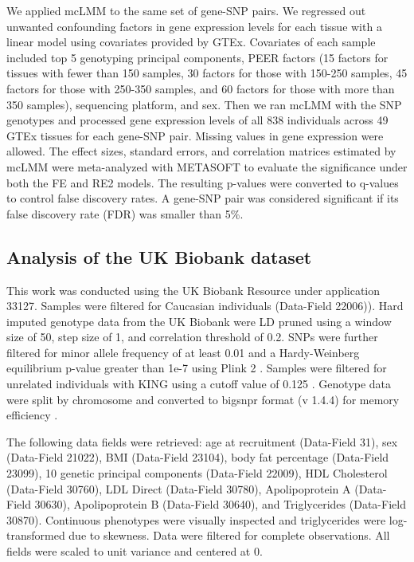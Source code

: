         We applied mcLMM to the same set of gene-SNP pairs. We regressed out unwanted confounding factors in gene expression levels for each tissue with a linear model using covariates provided by GTEx. Covariates of each sample included 
        top 5 genotyping principal components, PEER factors \cite{Stegle2012-zc} (15 factors for tissues with fewer than 150 samples, 30 factors for those with 150-250 samples, 45 factors for those with 250-350 samples, and 60 factors for those with more than 350 samples), sequencing platform, and sex. Then we ran mcLMM with the SNP genotypes and processed gene expression levels of all 838 individuals across 49 GTEx tissues for each gene-SNP pair. Missing values in gene expression were allowed. The effect sizes, standard errors, and correlation matrices estimated by mcLMM were meta-analyzed with METASOFT to evaluate the significance under both the FE and RE2 models. The resulting p-values were converted to q-values \cite{qvalue} to control false discovery rates. A gene-SNP pair was considered significant if its false discovery rate (FDR) was smaller than 5\%.
    
    \subsection{Analysis of the UK Biobank dataset}
        This work was conducted using the UK Biobank Resource under application 33127. Samples were filtered for Caucasian individuals (Data-Field 22006)). Hard imputed genotype data from the UK Biobank were LD pruned using a window size of 50, step size of 1, and correlation threshold of 0.2. SNPs were further filtered for minor allele frequency of at least 0.01 and a Hardy-Weinberg equilibrium p-value greater than 1e-7 using Plink 2 \cite{PLINK2}. Samples were filtered for unrelated individuals with KING using a cutoff value of 0.125 \cite{KING}. Genotype data were split by chromosome and converted to bigsnpr format (v 1.4.4) for memory efficiency \cite{bigsnpr}.
        
        The following data fields were retrieved: age at recruitment (Data-Field 31), sex (Data-Field 21022), BMI (Data-Field 23104), body fat percentage (Data-Field 23099), 10 genetic principal components (Data-Field 22009), HDL Cholesterol (Data-Field 30760), LDL Direct (Data-Field 30780), Apolipoprotein A (Data-Field 30630), Apolipoprotein B (Data-Field 30640), and Triglycerides (Data-Field 30870). Continuous phenotypes were visually inspected and triglycerides were log-transformed due to skewness. Data were filtered for complete observations. All fields were scaled to unit variance and centered at 0. 
        
